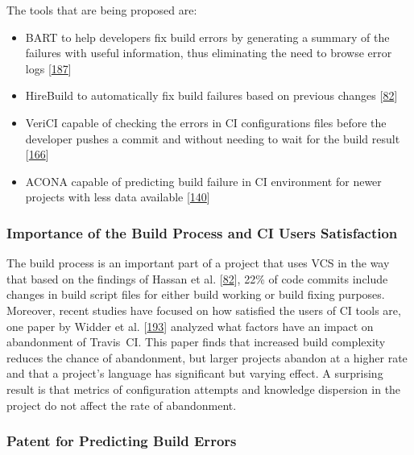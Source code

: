 \documentclass[]{book}
\providecommand{\tightlist}{%
  \setlength{\itemsep}{0pt}\setlength{\parskip}{0pt}}
\begin{document}
The tools that are being proposed are:

\begin{itemize}
\tightlist
\item
  BART to help developers fix build errors by generating a summary of
  the failures with useful information, thus eliminating the need to
  browse error logs {[}\protect\hyperlink{ref-vassallo2018break}{187}{]}
\item
  HireBuild to automatically fix build failures based on previous
  changes {[}\protect\hyperlink{ref-hassan2018hirebuild}{82}{]}
\item
  VeriCI capable of checking the errors in CI configurations files
  before the developer pushes a commit and without needing to wait for
  the build result
  {[}\protect\hyperlink{ref-santolucito2018statically}{166}{]}
\item
  ACONA capable of predicting build failure in CI environment for newer
  projects with less data available
  {[}\protect\hyperlink{ref-ni2018acona}{140}{]}
\end{itemize}

\subsubsection{Importance of the Build Process and CI Users
Satisfaction}\label{importance-of-the-build-process-and-ci-users-satisfaction}

The build process is an important part of a project that uses VCS in the
way that based on the findings of Hassan et al.
{[}\protect\hyperlink{ref-hassan2018hirebuild}{82}{]}, 22\% of code
commits include changes in build script files for either build working
or build fixing purposes. Moreover, recent studies have focused on how
satisfied the users of CI tools are, one paper by Widder et al.
{[}\protect\hyperlink{ref-widder2018m}{193}{]} analyzed what factors
have an impact on abandonment of Travis~CI. This paper finds that
increased build complexity reduces the chance of abandonment, but larger
projects abandon at a higher rate and that a project's language has
significant but varying effect. A surprising result is that metrics of
configuration attempts and knowledge dispersion in the project do not
affect the rate of abandonment.

\subsubsection{Patent for Predicting Build
Errors}\label{patent-for-predicting-build-errors}
\end{document}
